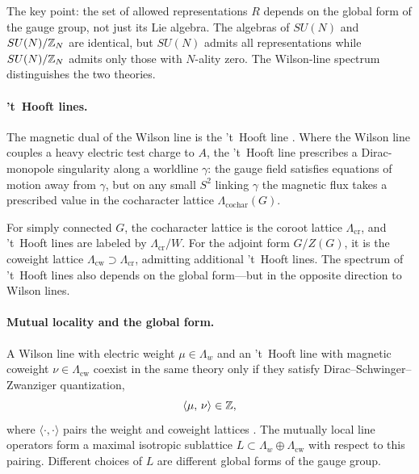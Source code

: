 The key point: the set of allowed representations $R$ depends on the global form of the gauge group, not just its Lie algebra. The algebras of $SU(N)$ and $SU(N)/\mathbb{Z}_N$ are identical, but $SU(N)$ admits all representations while $SU(N)/\mathbb{Z}_N$ admits only those with $N$-ality zero. The Wilson-line spectrum distinguishes the two theories.

\paragraph{'t~Hooft lines.}
The magnetic dual of the Wilson line is the 't~Hooft line \cite{tHooft1974MagneticMonopoles}. Where the Wilson line couples a heavy electric test charge to $A$, the 't~Hooft line prescribes a Dirac-monopole singularity along a worldline $\gamma$: the gauge field satisfies equations of motion away from $\gamma$, but on any small $S^2$ linking $\gamma$ the magnetic flux takes a prescribed value in the cocharacter lattice $\Lambda_{\text{cochar}}(G)$.

For simply connected $G$, the cocharacter lattice is the coroot lattice $\Lambda_{\text{cr}}$, and 't~Hooft lines are labeled by $\Lambda_{\text{cr}}/W$. For the adjoint form $G/Z(G)$, it is the coweight lattice $\Lambda_{\text{cw}}\supset\Lambda_{\text{cr}}$, admitting additional 't~Hooft lines. The spectrum of 't~Hooft lines also depends on the global form---but in the opposite direction to Wilson lines.

\paragraph{Mutual locality and the global form.}
A Wilson line with electric weight $\mu\in\Lambda_w$ and an 't~Hooft line with magnetic coweight $\nu\in\Lambda_{\text{cw}}$ coexist in the same theory only if they satisfy Dirac--Schwinger--Zwanziger quantization,
\begin{equation}
  \langle \mu,\,\nu\rangle \in \mathbb{Z},
  \label{eq:mutual-locality}
\end{equation}
where $\langle\cdot,\cdot\rangle$ pairs the weight and coweight lattices \cite{KapustinSaulinaLineOperatorsPlaceholder,GaiottoKapustinSeibergWillett2015GeneralizedSymmetries}. The mutually local line operators form a maximal isotropic sublattice $L\subset \Lambda_w\oplus\Lambda_{\text{cw}}$ with respect to this pairing. Different choices of $L$ are different global forms of the gauge group.


